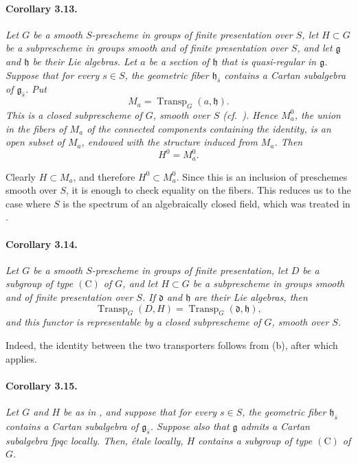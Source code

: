 \paragraph{\textbf{Corollary 3.13.}}
{\itshape Let \(G\) be a smooth \(S\)-prescheme in groups of finite
presentation over \(S\), let \(H\subset G\) be a subprescheme in
groups smooth and of finite presentation over \(S\), and let
\(\mathfrak g\) and \(\mathfrak h\) be their Lie algebras. Let
\(a\) be a section of \(\mathfrak h\) that is quasi-regular in
\(\mathfrak g\). Suppose that for every \(s\in S\), the geometric
fiber \(\mathfrak h_{\bar s}\) contains a Cartan subalgebra of
\(\mathfrak g_{\bar s}\). Put
\[
  M_a=\operatorname{Transp}_G(a,\mathfrak h).
\]
This is a closed subprescheme of \(G\), smooth over \(S\)
\textup{(cf.\ )}. Hence \(M_a^0\), the union in the fibers of
\(M_a\) of the connected components containing the identity, is
an open subset of \(M_a\), endowed with the structure induced from
\(M_a\). Then
\[
  H^0=M_a^0.
\]}

Clearly \(H\subset M_a\), and therefore
\(H^0\subset M_a^0\). Since this is an inclusion of preschemes
smooth over \(S\), it is enough to check equality on the fibers.
This reduces us to the case where \(S\) is the spectrum of an
algebraically closed field, which was treated in .

\paragraph{\textbf{Corollary 3.14.}}
{\itshape Let \(G\) be a smooth \(S\)-prescheme in groups of finite
presentation, let \(D\) be a subgroup of type \((\mathrm C)\) of
\(G\), and let \(H\subset G\) be a subprescheme in groups smooth
and of finite presentation over \(S\). If \(\mathfrak d\) and
\(\mathfrak h\) are their Lie algebras, then
\[
  \operatorname{Transp}_G(D,H)
  =
  \operatorname{Transp}_G(\mathfrak d,\mathfrak h),
\]
and this functor is representable by a closed subprescheme of
\(G\), smooth over \(S\).}

Indeed, the identity between the two transporters follows from
\textup{(b)}, after which  applies.

\paragraph{\textbf{Corollary 3.15.}}
{\itshape Let \(G\) and \(H\) be as in , and suppose that for
every \(s\in S\), the geometric fiber \(\mathfrak h_{\bar s}\)
contains a Cartan subalgebra of \(\mathfrak g_{\bar s}\). Suppose
also that \(\mathfrak g\) admits a Cartan subalgebra fpqc locally.
Then, étale locally, \(H\) contains a subgroup of type
\((\mathrm C)\) of \(G\).}

